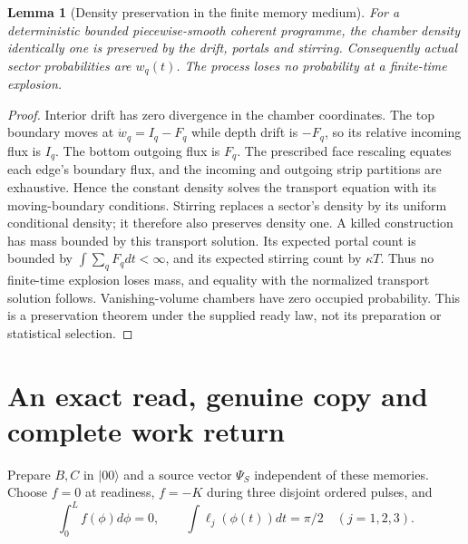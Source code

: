 \documentclass[11pt,oneside,openany]{book}
\newtheorem{lemma}[theorem]{Lemma}
\theoremstyle{definition}
\theoremstyle{remark}\newtheorem{remark}[theorem]{Remark}
\begin{document}
\begin{lemma}[Density preservation in the finite memory medium]\label{acc:chamberdensity}
For a deterministic bounded piecewise-smooth coherent programme, the
chamber density identically one is preserved by the drift, portals and
stirring. Consequently actual sector probabilities are $w_q(t)$.
The process loses no probability at a finite-time explosion.
\end{lemma}
\begin{proof}
Interior drift has zero divergence in the chamber coordinates. The top
boundary moves at $\dot w_q=I_q-F_q$ while depth drift is $-F_q$,
so its relative incoming flux is $I_q$. The bottom outgoing flux is $F_q$.
The prescribed face rescaling equates each edge's boundary flux, and the
incoming and outgoing strip partitions are exhaustive. Hence the constant
density solves the transport equation with its moving-boundary conditions.
Stirring replaces a sector's density by its uniform conditional density;
it therefore also preserves density one. A killed construction has mass
bounded by this transport solution. Its expected portal count is bounded
by $\int\sum_qF_qdt<\infty$, and its expected stirring count by $\kappa T$.
Thus no finite-time explosion loses mass, and equality with the normalized
transport solution follows. Vanishing-volume chambers have zero occupied
probability. This is a preservation theorem under the supplied ready law,
not its preparation or statistical selection.
\end{proof}

\section{An exact read, genuine copy and complete work return}
Prepare $B,C$ in $\lvert00\rangle$ and a source vector $\Psi_S$ independent
of these memories. Choose $f=0$ at readiness, $f=-K$ during three disjoint
ordered pulses, and
\begin{equation}
 \int_0^Lf(\phi)d\phi=0,\qquad
 \int\ell_j(\phi(t))dt=\pi/2\quad(j=1,2,3).
 \label{acc:rotorprofiles}
\end{equation}
\end{document}
